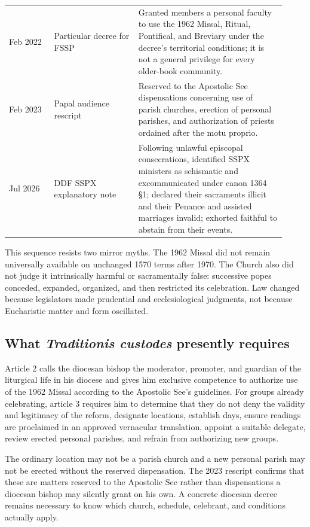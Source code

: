 \begin{longtable}{>{\bfseries\raggedright\arraybackslash}p{0.15\linewidth}>{\raggedright\arraybackslash}p{0.28\linewidth}>{\raggedright\arraybackslash}p{0.49\linewidth}}
11 Feb 2022 & Particular decree for FSSP & Granted members a personal faculty to use the 1962 Missal, Ritual, Pontifical, and Breviary under the decree's territorial conditions; it is not a general privilege for every older-book community.\\
20 Feb 2023 & Papal audience rescript & Reserved to the Apostolic See dispensations concerning use of parish churches, erection of personal parishes, and authorization of priests ordained after the motu proprio.\\
2 Jul 2026 & DDF SSPX explanatory note & Following unlawful episcopal consecrations, identified SSPX ministers as schismatic and excommunicated under canon 1364 \S1; declared their sacraments illicit and their Penance and assisted marriages invalid; exhorted faithful to abstain from their events.\\
\bottomrule
\end{longtable}

This sequence resists two mirror myths. The 1962 Missal did not remain universally available on unchanged 1570 terms after 1970. The Church also did not judge it intrinsically harmful or sacramentally false: successive popes conceded, expanded, organized, and then restricted its celebration. Law changed because legislators made prudential and ecclesiological judgments, not because Eucharistic matter and form oscillated.

\subsection{What \emph{Traditionis custodes} presently requires}

Article 2 calls the diocesan bishop the moderator, promoter, and guardian of the liturgical life in his diocese and gives him exclusive competence to authorize use of the 1962 Missal according to the Apostolic See's guidelines. For groups already celebrating, article 3 requires him to determine that they do not deny the validity and legitimacy of the reform, designate locations, establish days, ensure readings are proclaimed in an approved vernacular translation, appoint a suitable delegate, review erected personal parishes, and refrain from authorizing new groups.

The ordinary location may not be a parish church and a new personal parish may not be erected without the reserved dispensation. The 2023 rescript confirms that these are matters reserved to the Apostolic See rather than dispensations a diocesan bishop may silently grant on his own. A concrete diocesan decree remains necessary to know which church, schedule, celebrant, and conditions actually apply.


